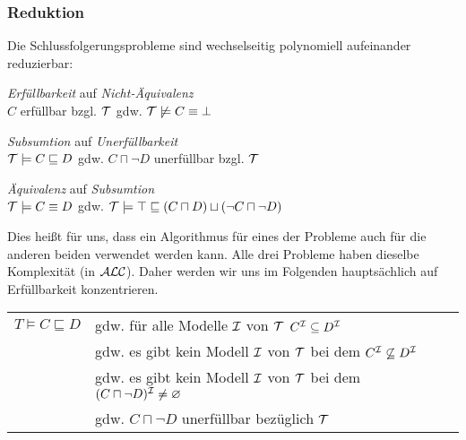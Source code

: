 \subsubsection{Reduktion}

Die Schlussfolgerungsprobleme sind wechselseitig polynomiell aufeinander reduzierbar:

\begin{lemma}\mbox{}
\begin{enumerate}
\item{\emph{Erfüllbarkeit} auf \emph{Nicht-Äquivalenz} \\
$C$ erfüllbar bzgl. $\mathcal{T}$ gdw. $\mathcal{T} \not\models C \equiv \bot$}
\item{\emph{Subsumtion} auf \emph{Unerfüllbarkeit} \\
$\mathcal{T} \models C \sqsubseteq D$ gdw. $C \sqcap \neg D$ unerfüllbar bzgl.
$\mathcal{T}$
\item{\emph{Äquivalenz} auf \emph{Subsumtion} \\}
$\mathcal{T} \models C \equiv D$ gdw. $\MT \models \top \sqsubseteq \left( C \sqcap D \right) \sqcup \left( \neg C \sqcap \neg D \right)$}
\end{enumerate}
\end{lemma}

Dies heißt für uns, dass ein Algorithmus für eines der Probleme auch für die
anderen beiden verwendet werden kann. Alle drei Probleme haben dieselbe
Komplexität (in $\mathcal{A}\mathcal{L}\mathcal{C}$). Daher werden wir uns im Folgenden hauptsächlich auf
Erfüllbarkeit konzentrieren.

\begin{tafel}\mbox{}
    \begin{center} \begin{tabular}{ll}
        $T \models C \sqsubseteq D$ & gdw. für alle Modelle $\mathcal{I}$ von $\mathcal{T}$ $C^{\mathcal{I}} \subseteq D^{\mathcal{I}}$\\
                                    & gdw. es gibt kein Modell $\mathcal{I}$ von $\mathcal{T}$ bei dem $C^{\mathcal{I}} \not\subseteq D^{\mathcal{I}}$\\
                                    & gdw. es gibt kein Modell $\mathcal{I}$ von $\mathcal{T}$ bei dem $(C \sqcap \neg D)^{\mathcal{I}} \neq \varnothing$\\
                                    & gdw. $C \sqcap \neg D$ unerfüllbar bezüglich $\mathcal{T}$\\
    \end{tabular}
\end{center}
\end{tafel}

